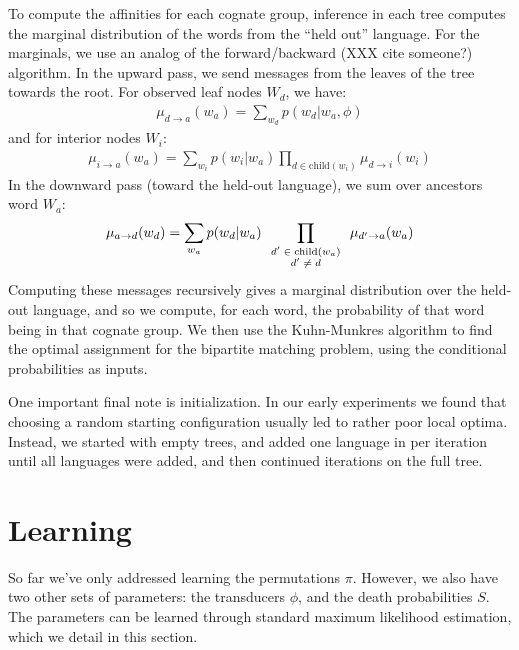 \documentclass[11pt,a4paper]{article}
\begin{document}
To compute the affinities for each cognate group, inference in each
tree computes the marginal distribution of the words from the ``held
out'' language. For the marginals, we use an analog of the 
forward/backward (XXX cite someone?) algorithm. In the upward pass,
we send messages from the leaves of the tree towards the root. For observed
leaf nodes $W_d$, we have:
\begin{equation*}
  \begin{split}
    \mu_{d\to a}(w_a) = \sum_{w_d} p(w_d|w_a,\phi)
   \end{split}
 \end{equation*}
and for interior nodes $W_i$:
\begin{equation*}
  \begin{split}
    \mu_{i\to a}(w_a) = \sum_{w_i} p(w_i|w_a) \prod_{d \in \mathrm{child}(w_i)} \mu_{d \to i}(w_i) 
  \end{split}
\end{equation*}
In the downward pass (toward the held-out language), we sum over ancestors word $W_a$:
\begin{equation*}
  \begin{split}
    \mu_{a\to d}(w_d) = \sum_{w_a} p(w_d|w_a) \prod_{\scriptsize \begin{array}{cc}d' \in \mathrm{child}(w_a) \\ d' \neq d \end{array}} \mu_{d' \to a}(w_a) 
  \end{split}
\end{equation*}
Computing these messages recursively gives a marginal distribution
over the held-out language, and so we compute, for each word, the
probability of that word being in that cognate group. We then use
the Kuhn-Munkres algorithm \cite{Kuhn1955} to find the optimal
assignment for the bipartite matching problem, using the conditional
probabilities as inputs.

One important final note is initialization. In our early experiments
we found that choosing a random starting configuration usually led
to rather poor local optima. Instead, we started with empty trees,
and added one language in per iteration until all languages were
added, and then continued iterations on the full tree.

\section{Learning} 

So far we've only addressed learning the permutations $\pi$. However,
we also have two other sets of parameters: the transducers $\phi$,
and the death probabilities $S$. The parameters can be learned
through standard maximum likelihood estimation, which we detail in
this section.
\end{document}
